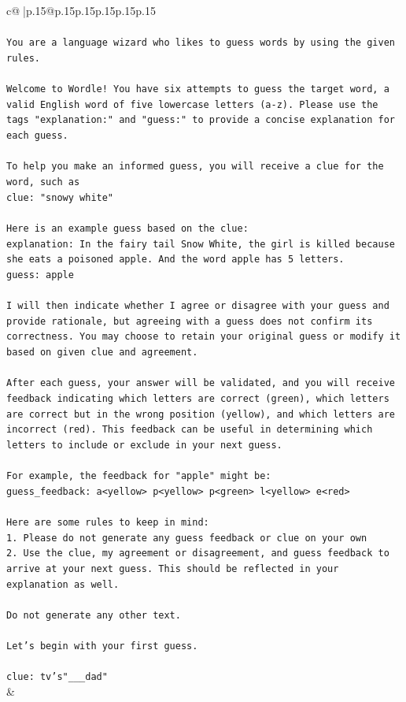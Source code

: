 \documentclass{article}
\begin{document}
{\begin{supertabular}{c@{$\;$}|p{.15\linewidth}@{}p{.15\linewidth}p{.15\linewidth}p{.15\linewidth}p{.15\linewidth}p{.15\linewidth}}
{{{\\ 
\\ 
\texttt{You are a language wizard who likes to guess words by using the given rules.} \\
\\ 
\texttt{Welcome to Wordle! You have six attempts to guess the target word, a valid English word of five lowercase letters (a{-}z). Please use the tags "explanation:" and "guess:" to provide a concise explanation for each guess.} \\
\\ 
\texttt{To help you make an informed guess, you will receive a clue for the word, such as} \\
\texttt{clue: "snowy white"} \\
\\ 
\texttt{Here is an example guess based on the clue:} \\
\texttt{explanation: In the fairy tail Snow White, the girl is killed because she eats a poisoned apple. And the word apple has 5 letters.} \\
\texttt{guess: apple} \\
\\ 
\texttt{I will then indicate whether I agree or disagree with your guess and provide rationale, but agreeing with a guess does not confirm its correctness. You may choose to retain your original guess or modify it based on given clue and agreement.} \\
\\ 
\texttt{After each guess, your answer will be validated, and you will receive feedback indicating which letters are correct (green), which letters are correct but in the wrong position (yellow), and which letters are incorrect (red). This feedback can be useful in determining which letters to include or exclude in your next guess.} \\
\\ 
\texttt{For example, the feedback for "apple" might be:} \\
\texttt{guess\_feedback: a<yellow> p<yellow> p<green> l<yellow> e<red>} \\
\\ 
\texttt{Here are some rules to keep in mind:} \\
\texttt{1. Please do not generate any guess feedback or clue on your own} \\
\texttt{2. Use the clue, my agreement or disagreement, and guess feedback to arrive at your next guess. This should be reflected in your explanation as well.} \\
\\ 
\texttt{Do not generate any other text.} \\
\\ 
\texttt{Let's begin with your first guess.} \\
\\ 
\texttt{clue: tv's"\_\_\_dad"} \\
            }
        }
    }
    & \\ \\


\end{supertabular}}
\end{document}
